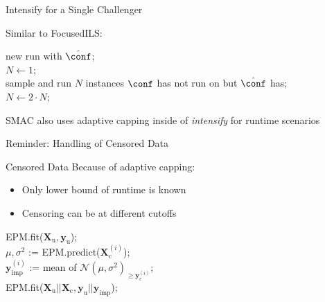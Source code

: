 \begin{frame}[c, fragile]{Intensify for a Single Challenger}
\LinesNotNumbered

Similar to FocusedILS:

\bigskip

\begin{algorithm}[H]
\BlankLine
new run with $\hat{\conf}$;\\
\pause
$N \leftarrow 1$;\\
 {
	\pause
	sample and run $N$ instances $\conf$ has not run on but $\hat{\conf}$ has;\\
	\pause
	{
		\Return{$\hat{\conf}$
	}
}
$N \leftarrow 2 \cdot N$;\\
}
\pause
\Return{$\hat{\conf} \leftarrow \conf$}
\caption{Intensify (only for a \textbf{single challenger})}

\end{algorithm}

\medskip
\pause
SMAC also uses adaptive capping inside of \textit{intensify} 
for runtime scenarios 

\end{frame}
\begin{frame}[c]{Reminder: Handling of Censored Data}

\begin{block}{Censored Data}
Because of adaptive capping:
\begin{itemize}
  \item Only lower bound of runtime is known 
  \item Censoring can be at different cutoffs 
\end{itemize}
\end{block}

\pause

\begin{algorithm}[H]
\BlankLine
EPM.fit($\mathbf{X}_{\text{u}}, \mathbf{y}_{\text{u}}$);\\
 {
	 {
		$\mu,\sigma^2$ := EPM.predict($\mathbf{X}_{\text{c}}^{(i)}$);\\
		$\mathbf{y}_{\text{imp}}^{(i)}$ := mean of $\mathcal{N}(\mu, \sigma^2)_{\geq \mathbf{y}_{\text{c}}^{(i)}}$;\\
	}
	EPM.fit($\mathbf{X}_{\text{u}} || \mathbf{X}_{\text{c}}, \mathbf{y}_{\text{u}} || \mathbf{y}_{\text{imp}}$);\\
}
\end{algorithm}

\end{frame}
